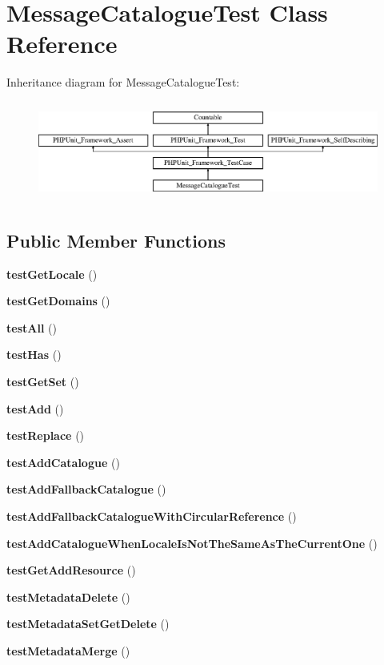 \section{Message\+Catalogue\+Test Class Reference}
\label{class_symfony_1_1_component_1_1_translation_1_1_tests_1_1_message_catalogue_test}
Inheritance diagram for Message\+Catalogue\+Test\+:\begin{figure}[H]
\begin{center}
\leavevmode
\includegraphics[height=3.303835cm]{class_symfony_1_1_component_1_1_translation_1_1_tests_1_1_message_catalogue_test}
\end{center}
\end{figure}
\subsection*{Public Member Functions}
\begin{DoxyCompactItemize}
\item 
{\bf test\+Get\+Locale} ()
\item 
{\bf test\+Get\+Domains} ()
\item 
{\bf test\+All} ()
\item 
{\bf test\+Has} ()
\item 
{\bf test\+Get\+Set} ()
\item 
{\bf test\+Add} ()
\item 
{\bf test\+Replace} ()
\item 
{\bf test\+Add\+Catalogue} ()
\item 
{\bf test\+Add\+Fallback\+Catalogue} ()
\item 
{\bf test\+Add\+Fallback\+Catalogue\+With\+Circular\+Reference} ()
\item 
{\bf test\+Add\+Catalogue\+When\+Locale\+Is\+Not\+The\+Same\+As\+The\+Current\+One} ()
\item 
{\bf test\+Get\+Add\+Resource} ()
\item 
{\bf test\+Metadata\+Delete} ()
\item 
{\bf test\+Metadata\+Set\+Get\+Delete} ()
\item 
{\bf test\+Metadata\+Merge} ()
\end{DoxyCompactItemize}
